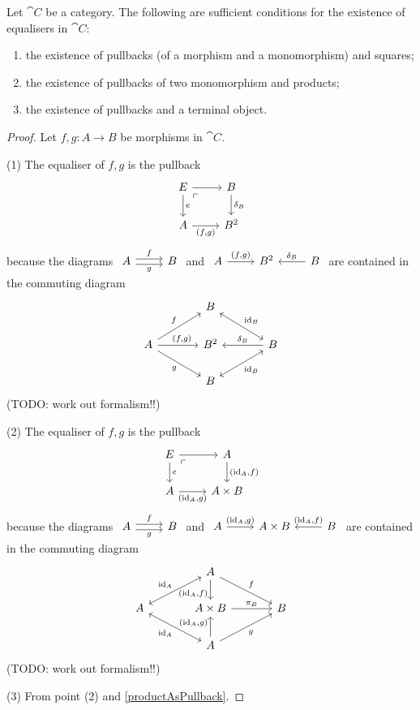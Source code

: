 \begin{proposition}
Let $\cat{C}$ be a category. The following are sufficient conditions for the existence of equalisers in $\cat{C}$:
\begin{enumerate}
\item the existence of pullbacks (of a morphism and a monomorphism) and squares;
\item the existence of pullbacks of two monomorphism and products;
\item the existence of pullbacks and a terminal object.
\end{enumerate}
\end{proposition}
\begin{proof}
Let $f,g: A\to B$ be morphisms in $\cat{C}$.

(1) The equaliser of $f,g$ is the pullback
\[ \begin{tikzcd}
E \arrow[r] \arrow[d, "e"] \pbCorner & B \arrow[d, "{\delta_B}"] \\
A \arrow[r, swap, "{(f,g)}"] & B^2
\end{tikzcd} \]
because the diagrams $\begin{tikzcd}
A \ar[r, shift left, "f"] \ar[r, shift right, swap, "g"] & B
\end{tikzcd}$ and $\begin{tikzcd}
A \ar[r, "{(f,g)}"] & B^2 & \ar[l, swap, "{\delta_B}"] B
\end{tikzcd}$ are contained in the commuting diagram
\[ \begin{tikzcd}[column sep=large]
& B \ar[dr, leftrightarrow, "{\id_B}"] & \\
A \ar[r, pos=0.6, "{(f,g)}"] \ar[ur, "f"] \ar[dr, swap, "g"] & B^2 & \ar[l, swap, "{\delta_B}"] B \\
& B \ar[ur,swap, leftrightarrow, "{\id_B}"] &
\end{tikzcd} \]
(TODO: work out formalism!!)

(2) The equaliser of $f,g$ is the pullback
\[ \begin{tikzcd}
E \arrow[r] \arrow[d, "e"] \pbCorner & A \arrow[d, "{(\id_A, f)}"] \\
A \arrow[r, swap, "{(\id_A,g)}"] & A\times B
\end{tikzcd} \]
because the diagrams $\begin{tikzcd}
A \ar[r, shift left, "f"] \ar[r, shift right, swap, "g"] & B
\end{tikzcd}$ and $\begin{tikzcd}
A \ar[r, "{(\id_A,g)}"] & A\times B & \ar[l, swap, "{(\id_A, f)}"] B
\end{tikzcd}$ are contained in the commuting diagram
\[ \begin{tikzcd}[column sep=large]
& A \ar[dr, "{f}"] \ar[d, swap, pos=0.7, "{(\id_A, f)}"] & \\
A \ar[ur, leftrightarrow, "{\id_A}"] \ar[dr, leftrightarrow, swap, "{\id_A}"] & A\times B \ar[r, "{\proj_B}"] & B \\
& A \ar[ur, swap, "{g}"] \ar[u, pos=0.7, "{(\id_A, g)}"] &
\end{tikzcd} \]
(TODO: work out formalism!!)

(3) From point (2) and \ref{productAsPullback}.
\end{proof}

